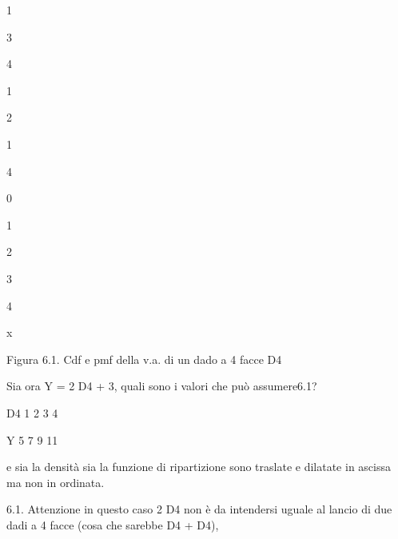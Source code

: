 \documentclass[a4paper,portrait,12pt]{article}
\begin{document}
1


3


4


1


2


1


4





0





1





2





3





4





\begin{flushleft}
x
\end{flushleft}





\begin{flushleft}
Figura 6.1. Cdf e pmf della v.a. di un dado a 4 facce D4
\end{flushleft}





\begin{flushleft}
Sia ora Y = 2 D4 + 3, quali sono i valori che pu\`{o} assumere6.1?
\end{flushleft}


\begin{flushleft}
D4 1 2 3 4
\end{flushleft}


\begin{flushleft}
Y 5 7 9 11
\end{flushleft}


\begin{flushleft}
e sia la densit\`{a} sia la funzione di ripartizione sono traslate e dilatate in ascissa ma non in ordinata.
\end{flushleft}


\begin{flushleft}
6.1. Attenzione in questo caso 2 D4 non \`{e} da intendersi uguale al lancio di due dadi a 4 facce (cosa che sarebbe D4 + D4),
\end{flushleft}
\end{document}

